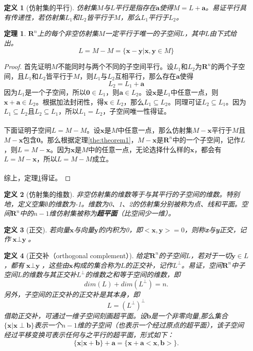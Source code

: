\documentclass[a4paper,11pt,oneside]{article}
\newtheorem{definition}{定义}[section]
\newtheorem{theorem}{定理}[section]
\newtheorem{proof}{证明}[section]
\begin{document}
			\begin{definition}[仿射集的平行]
				仿射集$M$与$L$平行是指存在$\textbf{a}$使得$M=L+\textbf{a}$。易证平行具有传递性，若仿射集$L_{1}$和$L_{2}$皆平行于$M$，那么$L_{1}$平行于$L_{2}$。
			\end{definition}
			\begin{theorem}
				\label{the:theorem2}
				$\textbf{R}^{n}$上的每个非空仿射集$M$一定平行于唯一的子空间$L$，其中$L$由下式给出。
				$$L=M-M=\{\textbf{x}-\textbf{y}|\textbf{x},\textbf{y}\in M\}$$
			\end{theorem}
			\begin{proof}
				首先证明$M$不能同时与两个不同的子空间平行。设$L_{1}$和$L_{2}$为$\textbf{R}^{n}$的两个子空间，且$L_{1}$和$L_{2}$皆平行于$M$，则$L_{1}$与$L_{2}$互相平行，那么存在$\textbf{a}$使得
				$$L_{2}=L_{1}+\textbf{a}$$
				因为$L_{1}$是一个子空间，所以$\textbf{0} \in L_{1}$，则$\textbf{a} \in L_{2}$。设$\textbf{x}$是$L_{1}$中任意一点，则$\textbf{x}+\textbf{a} \in L_{2}$。根据加法封闭性，得$\textbf{x} \in L_{2}$，那么$L_{1} \subseteq L_{2}$。同理可证$L_{2} \subseteq L_{1}$。因为$L_{1} \subseteq L_{2}$且$L_{2} \subseteq L_{1}$，所以$L_{1} = L_{2}$，子空间唯一性得证。\\
				\\
				下面证明子空间$L=M-M$。设$\textbf{x}$是$M$中任意一点，那么仿射集$M-\textbf{x}$平行于$M$且$M-\textbf{x}$包含$\textbf{0}$。那么根据定理\ref{the:theorem1}，$M-\textbf{x}$是$\textbf{R}^{n}$中的一个子空间，记作$L$，则$L=M-\textbf{x}$。因为$\textbf{x}$是$M$中的任意一点，无论选择什么样的$\textbf{x}$，都会有$L=M-\textbf{x}$，所以$L=M-M$成立。\\
				\\
				综上，定理\ref{the:theorem2}得证。
			\end{proof}
			\begin{definition}[仿射集的维数]
				非空仿射集的维数等于与其平行的子空间的维数。特别地，定义空集$\emptyset$的维数为-1。维数为0、1、2的仿射集分别被称为点、线和平面。空间$\textbf{R}^{n}$中的$n-1$维仿射集被称为\textbf{超平面}（比空间少一维）。
			\end{definition}
			\begin{definition}[正交]
				若向量$\textbf{x}$与向量$\textbf{y}$的内积为0，即$<\textbf{x},\textbf{y}>=0$，则称\textbf{x}与\textbf{y}正交，记作$\textbf{x} \perp \textbf{y}$。
			\end{definition}
			\begin{definition}[正交补（orthogonal complement）]
				给定$\textbf{R}^{n}$的子空间$L$，若对于一切$\textbf{y} \in L$，都有$\textbf{x} \perp \textbf{y}$，这些由$\textbf{x}$构成的集合称为$L$的正交补，记作$L^{\perp}$。易证，空间$\textbf{R}^{n}$中子空间$L$的维数与其正交补$L^{\perp}$的维数之和等于空间的维数，即
				$$dim(L)+dim(L^{\perp})=n.$$
				另外，子空间的正交补的正交补是其本身，即
				$$L=(L^{\perp})^{\perp}$$
				借助正交补，可通过一维子空间刻画超平面。设$\textbf{b}$是一个非零向量,那么集合$\{\textbf{x}|\textbf{x} \perp \textbf{b}\}$表示一个$n-1$维的子空间（也表示一个经过原点的超平面），该子空间经过平移变换可表示任何与之平行的超平面，形式如下：
				$$\{\textbf{x}|\textbf{x}+\textbf{b}\}+\textbf{a}=\{\textbf{x}+\textbf{a}<\textbf{x},\textbf{b}>\}.$$
			\end{definition}
\end{document}
